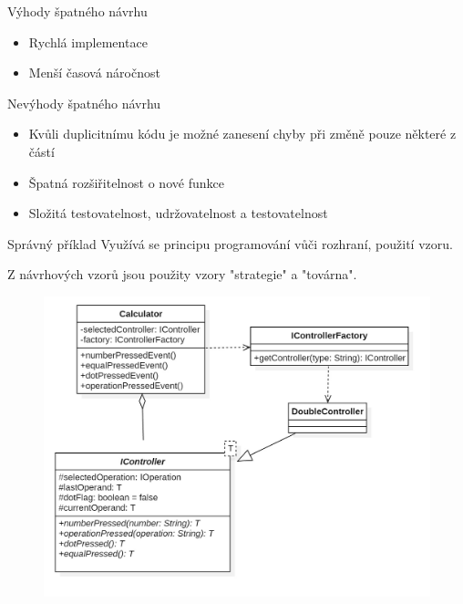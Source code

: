 \begin{frame}
	\vfill
	\begin{block}{Výhody špatného návrhu}
		\begin{itemize}
			\item Rychlá implementace
			\item Menší časová náročnost
		\end{itemize}
	\end{block}
	\begin{block}{Nevýhody špatného návrhu}
	\begin{itemize}
		\item Kvůli duplicitnímu kódu je možné zanesení chyby při změně pouze některé z částí
		\item Špatná rozšiřitelnost o nové funkce
		\item Složitá testovatelnost, udržovatelnost a testovatelnost
	\end{itemize}
\end{block}
\end{frame}
\begin{frame}
	\vfill
	\begin{block}{Správný příklad}
		Využívá se principu programování vůči rozhraní, použití vzoru. 
		
		Z návrhových vzorů jsou použity vzory "strategie" a "továrna".
			\begin{figure}[!ht]
			\begin{center}
				\includegraphics[scale=0.185]{obr/goodmodel1.jpg}
			\end{center}
		\end{figure}
	\end{block}
\end{frame}
